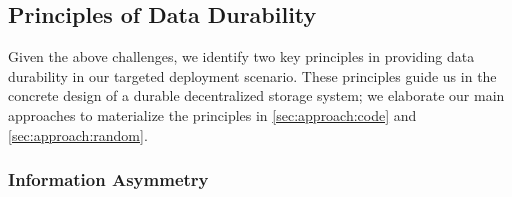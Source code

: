 
\subsection{Principles of Data Durability}
\label{sec:approach:principles}

Given the above challenges, we identify two key principles in providing data durability in our targeted deployment scenario.
These principles guide us in the concrete design of a durable decentralized storage system; we elaborate our main approaches to materialize the principles in \autoref{sec:approach:code} and \autoref{sec:approach:random}.

\subsubsection{\textbf{Information Asymmetry}}

